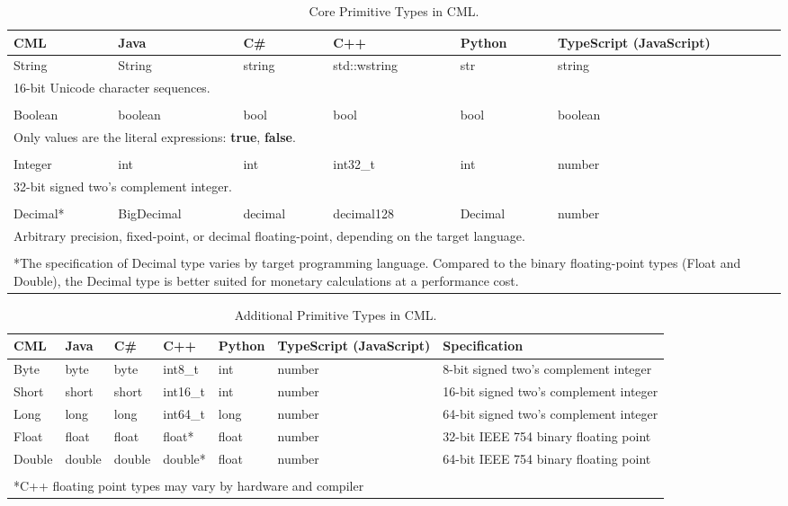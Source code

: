 \begin{table}[h]
\centering
\begin{tabular}
{l l l l l p{2cm} }
\hline
CML & Java & C\# & C++ & Python & TypeScript (JavaScript) \\
\hline
String & String & string & std::wstring & str & string \\
\multicolumn{6}{p{13cm}}{\footnotesize{16-bit Unicode character sequences.}} \\
\\
Boolean & boolean & bool & bool & bool & boolean \\
\multicolumn{6}{p{13cm}}{\footnotesize{Only values are the literal expressions: \textbf{true}, \textbf{false}.}}  \\
\\
Integer & int & int & int32\_t & int & number  \\
\multicolumn{6}{p{13cm}}{\footnotesize{32-bit signed two's complement integer.}}  \\
\\
Decimal* & BigDecimal & decimal & decimal128 & Decimal & number \\
\multicolumn{6}{p{13cm}}{\footnotesize{Arbitrary precision,
fixed-point,
or decimal floating-point,
depending on the target language.}} \\
\\
\multicolumn{6}{p{13cm}}{*The specification of Decimal type varies by target programming language.
Compared to the binary floating-point types (Float and Double),
the Decimal type is better suited for monetary calculations
at a performance cost.}
\end{tabular}
\caption{Core Primitive Types in CML.}
\label{tab:core-primitive-types}
\end{table}

\begin{table}[h]
\centering
\begin{tabular}
{l l l l l p{2cm} p{3.5cm} }
\hline
CML & Java & C\# & C++ & Python & TypeScript (JavaScript) & Specification \\
\hline
Byte & byte & byte & int8\_t & int & number & 8-bit signed two's complement integer \\
Short & short & short & int16\_t & int & number & 16-bit signed two's complement integer \\
Long & long & long & int64\_t & long & number & 64-bit signed two's complement integer \\
Float & float & float & float* & float & number & 32-bit IEEE 754 binary floating point \\
Double & double & double & double* & float & number & 64-bit IEEE 754 binary floating point \\
\\
\multicolumn{7}{p{12cm}}{*C++ floating point types may vary by hardware and compiler}
\end{tabular}
\caption{Additional Primitive Types in CML.}
\label{tab:additional-primitive-types}
\end{table}
